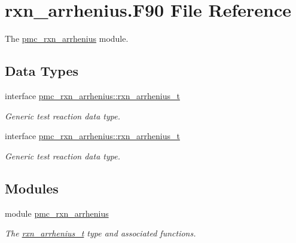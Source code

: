 \hypertarget{rxn__arrhenius_8_f90}{}\section{rxn\+\_\+arrhenius.\+F90 File Reference}
\label{rxn__arrhenius_8_f90}


The \mbox{\hyperlink{namespacepmc__rxn__arrhenius}{pmc\+\_\+rxn\+\_\+arrhenius}} module.  


\subsection*{Data Types}
\begin{DoxyCompactItemize}
\item 
interface \mbox{\hyperlink{structpmc__rxn__arrhenius_1_1rxn__arrhenius__t}{pmc\+\_\+rxn\+\_\+arrhenius\+::rxn\+\_\+arrhenius\+\_\+t}}
\begin{DoxyCompactList}\small\item\em Generic test reaction data type. \end{DoxyCompactList}\item 
interface \mbox{\hyperlink{structpmc__rxn__arrhenius_1_1rxn__arrhenius__t}{pmc\+\_\+rxn\+\_\+arrhenius\+::rxn\+\_\+arrhenius\+\_\+t}}
\begin{DoxyCompactList}\small\item\em Generic test reaction data type. \end{DoxyCompactList}\end{DoxyCompactItemize}
\subsection*{Modules}
\begin{DoxyCompactItemize}
\item 
module \mbox{\hyperlink{namespacepmc__rxn__arrhenius}{pmc\+\_\+rxn\+\_\+arrhenius}}
\begin{DoxyCompactList}\small\item\em The \mbox{\hyperlink{structpmc__rxn__arrhenius_1_1rxn__arrhenius__t}{rxn\+\_\+arrhenius\+\_\+t}} type and associated functions. \end{DoxyCompactList}\end{DoxyCompactItemize}
